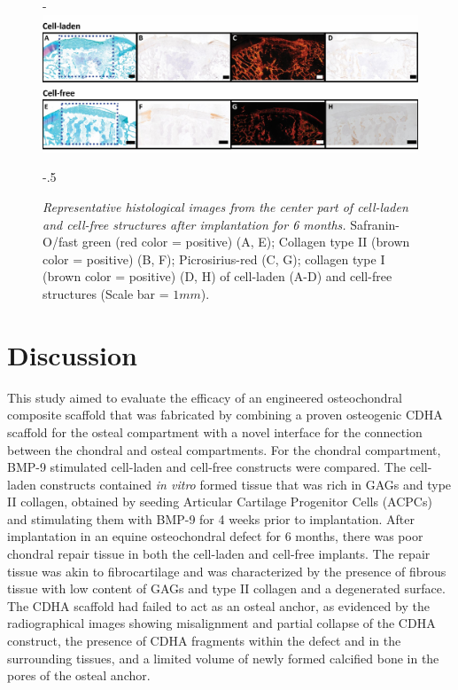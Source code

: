 \documentclass[twocolumn, empirical, authordate, issue]{jote-new-article}
\begin{document}
\begin{figure}[b!]
\captionsetup{width=\dimexpr\textwidth+\fullwidthlen\relax}
\begin{adjustwidth}{-\fullwidthlen}{}
\includegraphics[width=\textwidth+\fullwidthlen]{media/image11.jpg}
\end{adjustwidth}
\begin{adjustwidth}{-.5\fullwidthlen}{}
\caption{\emph{Representative histological images from the center part of cell-laden and cell-free structures after implantation for 6 months.} Safranin-O/fast green (red color = positive) (A, E); Collagen type II (brown color = positive) (B, F); Picrosirius-red (C, G); collagen type I (brown color = positive) (D, H) of cell-laden (A-D) and cell-free structures (Scale bar = $1mm$).}
\label{fig:figure11}
\end{adjustwidth}
\end{figure}


\section{Discussion} 

This study aimed to evaluate the efficacy of an engineered osteochondral composite scaffold that was fabricated by combining a proven osteogenic CDHA scaffold for the osteal compartment with a novel interface for the connection between the chondral and osteal compartments. For the chondral compartment, BMP-9 stimulated cell-laden and cell-free constructs were compared. The cell-laden constructs contained \emph{in vitro} formed tissue that was rich in GAGs and type II collagen, obtained by seeding Articular Cartilage Progenitor Cells (ACPCs) and stimulating them with BMP-9 for 4 weeks prior to implantation. After implantation in an equine osteochondral defect for 6 months, there was poor chondral repair tissue in both the cell-laden and cell-free implants. The repair tissue was akin to fibrocartilage and was characterized by the presence of fibrous tissue with low content of GAGs and type II collagen and a degenerated surface. The CDHA scaffold had failed to act as an osteal anchor, as evidenced by the radiographical images showing misalignment and partial collapse of the CDHA construct, the presence of CDHA fragments within the defect and in the surrounding tissues, and a limited volume of newly formed calcified bone in the pores of the osteal anchor.
\end{document}
